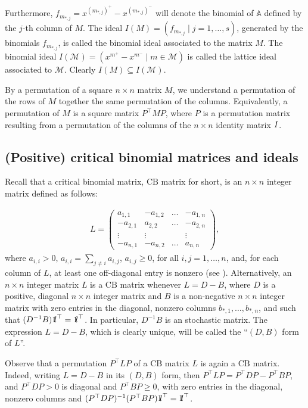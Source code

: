\documentclass[10pt]{amsart}
\newcommand{\mba}{\mbox{$\mathbb{A}$}}
\newcommand{\mbone}{\mbox{$1\mkern-4.6mu {\rm l}$}}
\newcommand{\mcm}{\mbox{$\mathcal{M}$}}
\newcommand{\cb}{\mbox{$\mathrm{CB}$}}
\newcommand{\I}{\mbox{${\rm I}$}}
\theoremstyle{definition}
\theoremstyle{remark}
\begin{document}
Furthermore, $f_{m_{*,j}}=x^{(m_{*,j})^+}-x^{(m_{*,j})^-}$ will denote
the binomial of $\mba$ defined by the $j$-th column of $M$. The ideal
$I(M)=(f_{m_{*,j}}\mid j=1,\ldots ,s)$, generated by the binomials
$f_{m_{*,j}}$, is called the binomial ideal associated to the matrix
$M$. The binomial ideal $I(\mcm)=(x^{m^+}-x^{m^-}\mid m\in\mcm)$ is
called the lattice ideal associated to $\mcm$. Clearly $I(M)\subseteq
I(\mcm)$.

By a permutation of a square $n\times n$ matrix $M$, we understand a
permutation of the rows of $M$ together the same permutation of the
columns. Equivalently, a permutation of $M$ is a square matrix
$P^{\top}MP$, where $P$ is a permutation matrix resulting from a
permutation of the columns of the $n\times n$ identity matrix $\I$.

\subsection{(Positive) critical binomial matrices and ideals}
\label{pcbcb}%

 Recall that a critical binomial matrix, $\cb$ matrix for
short, is an $n\times n$ integer matrix defined as follows:

\begin{eqnarray}\label{cbmatrix}
L=\left(\begin{array}{rrrr}
a_{1,1}&-a_{1,2}&\ldots&-a_{1,n}\\
-a_{2,1}&a_{2,2}&\ldots&-a_{2,n}\\
\vdots\phantom{+}&\vdots\phantom{+}&&\vdots\phantom{+}\\
-a_{n,1}&-a_{n,2}&\ldots&a_{n,n}
\end{array}\right),
\end{eqnarray}
where $a_{i,i}>0$, $a_{i,i}=\sum_{j\neq i}a_{i,j}$, $a_{i,j}\geq 0$,
for all $i,j=1,\ldots ,n$, and, for each column of $L$, at least one
off-diagonal entry is nonzero (see \cite{opv}). Alternatively, an
$n\times n$ integer matrix $L$ is a $\cb$ matrix whenever $L=D-B$,
where $D$ is a positive, diagonal $n\times n$ integer matrix and $B$
is a non-negative $n\times n$ integer matrix with zero entries in the
diagonal, nonzero columns $b_{*,1},\ldots ,b_{*,n}$, and such that
$(D^{-1}B)\mbone^{\top}=\mbone^{\top}$. In particular, $D^{-1}B$ is an
stochastic matrix. The expression $L=D-B$, which is clearly unique,
will be called the ``$(D,B)$ form of $L$''.

Observe that a permutation $P^{\top}LP$ of a $\cb$ matrix $L$ is again
a $\cb$ matrix. Indeed, writing $L=D-B$ in its $(D,B)$ form, then
$P^{\top}LP=P^{\top}DP-P^{\top}BP$, and $P^{\top}DP>0$ is diagonal and
$P^{\top}BP\geq 0$, with zero entries in the diagonal, nonzero columns
and $(P^{\top}DP)^{-1}(P^{\top}BP)\mbone^{\top}=\mbone^{\top}$.
\end{document}
